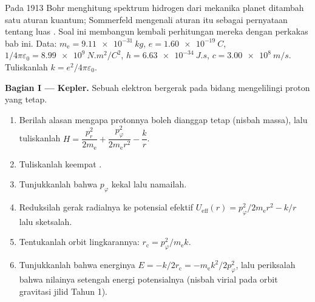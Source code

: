 \begin{problem}\label{pb:b3:hamiltonian-mechanics:1}
Pada 1913 Bohr menghitung spektrum hidrogen dari mekanika planet
ditambah satu aturan kuantum; Sommerfeld mengenali aturan itu sebagai
pernyataan tentang luas . Soal ini membangun kembali
perhitungan mereka dengan perkakas bab ini. Data: $m_{\text{e}} =
\qty{9.11e-31}{kg}$, $e = \qty{1.60e-19}{C}$, $1/4\pi\varepsilon_0 =
\qty{8.99e9}{N.m^2/C^2}$, $h = \qty{6.63e-34}{J.s}$, $c =
\qty{3.00e8}{m/s}$. Tuliskanlah $k = e^2/4\pi\varepsilon_0$.

\medskip\noindent\textbf{Bagian I ---  Kepler.}
Sebuah elektron bergerak pada bidang mengelilingi proton yang tetap.
\begin{enumerate}
  \item Berilah alasan mengapa protonnya boleh dianggap tetap
        (nisbah massa), lalu tuliskanlah
         $H = \dfrac{p_r^2}{2m_{\text{e}}} +
        \dfrac{p_\varphi^2}{2m_{\text{e}}r^2} - \dfrac{k}{r}$.
  \item Tuliskanlah keempat .
  \item Tunjukkanlah bahwa $p_\varphi$ kekal lalu namailah.
  \item Reduksilah gerak radialnya ke potensial efektif
        $U_{\text{eff}}(r) = p_\varphi^2/2m_{\text{e}}r^2 - k/r$ lalu
        sketsalah.
  \item Tentukanlah orbit lingkarannya: $r_{\text{c}} =
        p_\varphi^2/m_{\text{e}}k$.
  \item Tunjukkanlah bahwa energinya $E = -k/2r_{\text{c}} =
        -m_{\text{e}}k^2/2p_\varphi^2$, lalu periksalah bahwa nilainya
        setengah energi potensialnya (nisbah virial pada orbit
        gravitasi jilid Tahun 1).
\end{enumerate}


\end{problem}
